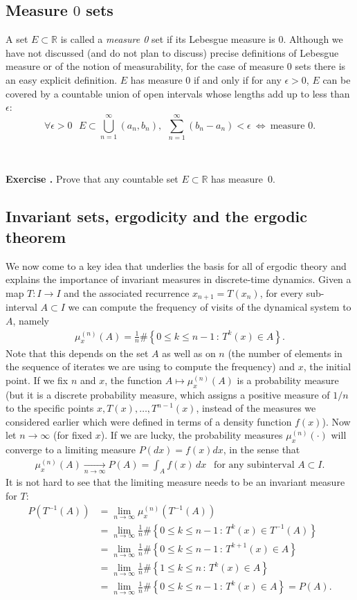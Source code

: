 \documentclass[12pt]{amsart}
\newcommand{\eqst}[1]{\begin{align*}#1\end{align*}}
\newcounter{exercise}
\newcommand{\beginexer}{\ \\ \addtocounter{exercise}{1} \textbf{Exercise \arabic{exercise}.} }
\begin{document}
\subsection{Measure $0$ sets}

A set $E\subset \mathbb{R}$ is called a \emph{measure 0} set if its Lebesgue measure is 0. Although we have not discussed (and do not plan to discuss) precise definitions of Lebesgue measure or of the notion of measurability, for the case of measure 0 sets there is an easy explicit definition. $E$ has measure 0 if and only if for any $\epsilon>0$, $E$ can be covered by a countable union of open intervals whose lengths add up to less than $\epsilon$:
$$ \forall \epsilon>0\ \ \ E\subset\bigcup_{n=1}^\infty (a_n, b_n), \ \  \sum_{n=1}^\infty (b_n-a_n) < \epsilon \ \iff \ \textrm{measure 0.}$$

\beginexer Prove that any countable set $E\subset \mathbb{R}$ has measure~0.

\subsection{Invariant sets, ergodicity and the ergodic theorem}

We now come to a key idea that underlies the basis for all of ergodic theory and explains the importance of invariant measures in discrete-time dynamics. Given a map $T:I\to I$ and the associated recurrence $x_{n+1}=T(x_n)$, for every sub-interval $A\subset I$ we can compute the frequency of visits of the dynamical system to $A$, namely
\eqst{
\mu_{x}^{(n)}(A) = \frac{1}{n} \# \left\{ 0\le k \le n-1\,:\, T^k(x) \in A \right\}.
}
Note that this depends on the set $A$ as well as on $n$ (the number of elements in the sequence of iterates we are using to compute the frequency) and $x$, the initial point. If we fix $n$ and $x$, the function $A\mapsto \mu_x^{(n)}(A)$ is a probability measure (but it is a discrete probability measure, which assigns a positive measure of $1/n$ to the specific points
$x,T(x),\ldots,T^{n-1}(x)$, instead of the measures we considered earlier which were defined in terms of a density function $f(x)$). Now let $n\to\infty$ (for fixed $x$). If we are lucky, the probability measures $\mu_x^{(n)}(\cdot)$ will converge to a limiting measure $P(dx)=f(x)dx$, in the sense that
\eqst{
\mu_x^{(n)}(A) \xrightarrow[n\to\infty]{} P(A) = \int_A f(x)\,dx \ \ \textrm{ for any subinterval }A\subset I.
}
It is not hard to see that the limiting measure needs to be an invariant measure for $T$:
\eqst{
P(T^{-1}(A)) &= \lim_{n\to\infty} \mu_x^{(n)}(T^{-1}(A)) \\ &
= \lim_{n\to\infty} \frac{1}{n}\#\left\{ 0\le k\le n-1\,:\,T^k(x)\in T^{-1}(A) \right\}
\\ &
= \lim_{n\to\infty} \frac{1}{n}\#\left\{ 0\le k\le n-1\,:\,T^{k+1}(x)\in A \right\}
\\ &
= \lim_{n\to\infty} \frac{1}{n}\#\left\{ 1\le k\le n\,:\,T^{k}(x)\in A \right\}
\\ &
= \lim_{n\to\infty} \frac{1}{n}\#\left\{ 0\le k\le n-1\,:\,T^{k}(x)\in A \right\} = P(A).
}
\end{document}

